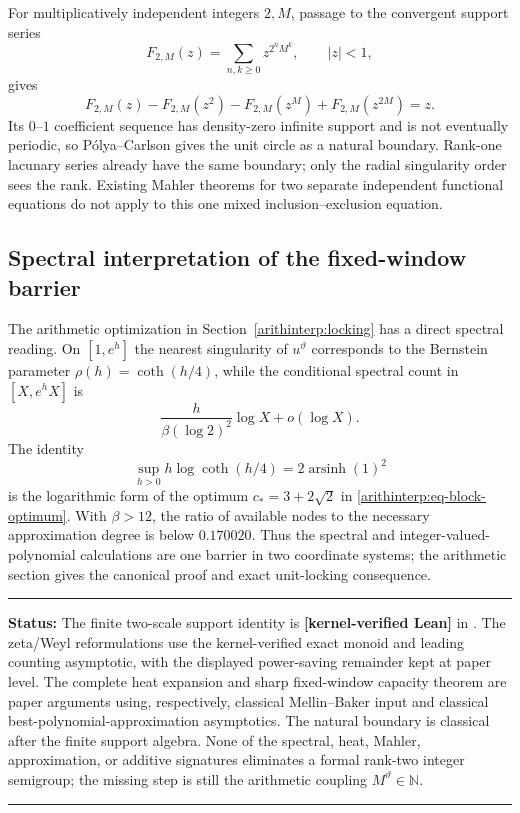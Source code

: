 \documentclass[11pt,oneside]{article}
\theoremstyle{definition}
\theoremstyle{remark}
\newcommand{\N}{\mathbb N}
\newcommand{\thetaq}{\vartheta}
\newcommand{\lean}[1]{\texttt{\detokenize{#1}}}
\newcommand{\statuslean}{\textcolor{leanblue}{\textbf{[kernel-verified Lean]}}}
\newenvironment{statusbox}[1]
{\begin{center}\begin{minipage}{0.94\textwidth}\raggedright\hbadness=10000\hrule
\vspace{0.45em}\textbf{Status:} #1\par\vspace{0.35em}}
{\vspace{0.35em}\hrule\end{minipage}\end{center}}
\begin{document}
For multiplicatively independent integers $2,M$, passage to the convergent support series
\begin{equation}
 F_{2,M}(z)=\sum_{n,k\ge0}z^{2^nM^k},\qquad |z|<1,
\end{equation}
gives
\begin{equation}
 F_{2,M}(z)-F_{2,M}(z^2)-F_{2,M}(z^M)+F_{2,M}(z^{2M})=z.
 \label{spec:eq-support-infinite}
\end{equation}
Its $0$--$1$ coefficient sequence has density-zero infinite support and is not eventually
periodic, so P\'olya--Carlson gives the unit circle as a natural boundary.  Rank-one lacunary
series already have the same boundary; only the radial singularity order sees the rank.
Existing Mahler theorems for two separate independent functional equations do not apply to
this one mixed inclusion--exclusion equation.

\subsection{Spectral interpretation of the fixed-window barrier}
\label{spec:approximation}

The arithmetic optimization in Section~\ref{arithinterp:locking} has a direct spectral
reading.  On $[1,e^h]$ the nearest singularity of $u^{\thetaq}$ corresponds to the
Bernstein parameter $\rho(h)=\coth(h/4)$, while the conditional spectral count in
$[X,e^hX]$ is
\[
 \frac{h}{\beta(\log2)^2}\log X+o(\log X).
\]
The identity
\[
 \sup_{h>0}h\log\coth(h/4)=2\operatorname{arsinh}(1)^2
\]
is the logarithmic form of the optimum $c_*=3+2\sqrt2$ in
\eqref{arithinterp:eq-block-optimum}.  With $\beta>12$, the ratio of available nodes to
the necessary approximation degree is below $0.170020$.  Thus the spectral and
integer-valued-polynomial calculations are one barrier in two coordinate systems; the
arithmetic section gives the canonical proof and exact unit-locking consequence.

\begin{statusbox}{The finite two-scale support identity is \statuslean{} in
\lean{TwoScaleSupportFinite}.  The zeta/Weyl
reformulations use the kernel-verified exact monoid and leading counting asymptotic, with the
displayed power-saving remainder kept at paper level.  The
complete heat expansion and sharp fixed-window capacity theorem are paper arguments using,
respectively, classical Mellin--Baker input and classical best-polynomial-approximation
asymptotics.  The natural boundary is classical after the finite support algebra.  None of
the spectral, heat, Mahler, approximation, or additive signatures eliminates a formal
rank-two integer semigroup; the missing step is still the arithmetic coupling
$M^{\thetaq}\in\N$.}
\end{statusbox}
\end{document}
